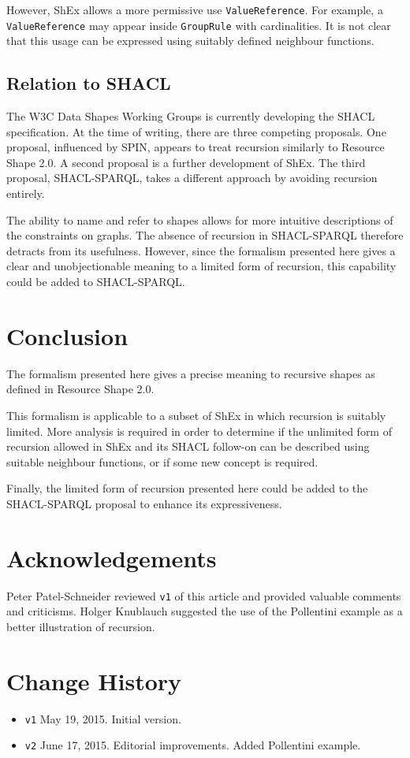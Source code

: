 \documentclass{article}
\begin{document}
However, ShEx allows a more permissive use {\tt ValueReference}. 
For example, a {\tt ValueReference} may appear inside {\tt GroupRule} with cardinalities.
It is not clear that this usage can be expressed using suitably defined neighbour functions.

\subsection{Relation to SHACL}

The W3C Data Shapes Working Groups is currently developing the SHACL specification.
At the time of writing, there are three competing proposals.
One proposal, influenced by SPIN, appears to treat recursion similarly to Resource Shape 2.0.
A second proposal is a further development of ShEx.
The third proposal, SHACL-SPARQL, takes a different approach by avoiding recursion entirely.

The ability to name and refer to shapes allows for more intuitive descriptions of the constraints on graphs.
The absence of recursion in SHACL-SPARQL therefore detracts from its usefulness.
However, since the formalism presented here gives a clear and unobjectionable meaning to a
limited form of recursion, this capability could be added to SHACL-SPARQL.

\section{Conclusion}
\label{sec-conclusion}

The formalism presented here gives a precise meaning to recursive shapes as defined in Resource Shape 2.0.

This formalism is applicable to a subset of ShEx in which recursion is suitably limited.
More analysis is required in order to determine if the unlimited form of recursion allowed in ShEx and its SHACL follow-on
can be described using suitable neighbour functions, or if some new concept is required.

Finally, the limited form of recursion presented here could be added to the SHACL-SPARQL proposal to enhance its
expressiveness.

\cbstart
\section*{Acknowledgements}

Peter Patel-Schneider reviewed {\tt v1} of this article and provided valuable comments and criticisms.
Holger Knublauch suggested the use of the Pollentini example as a better illustration of recursion.

\section*{Change History}
\begin{itemize}
\item {\tt v1} May 19, 2015. Initial version.
\item {\tt v2} June 17, 2015. Editorial improvements. Added Pollentini example.
\end{itemize}
\cbend


\end{document}
